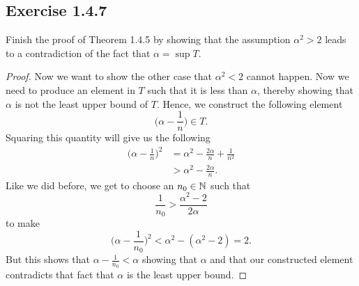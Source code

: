     \subsection{Exercise 1.4.7}

    Finish the proof of Theorem 1.4.5 by showing that the assumption \( \alpha ^2 > 2 \) leads to a contradiction of the fact that \( \alpha = \sup T \). 
        
        
    
    \begin{proof}
        Now we want to show the other case that \( \alpha^2 < 2 \) cannot happen. Now we need to produce an element in \( T \) such that it is less than \( \alpha \), thereby showing that \( \alpha \) is not the least upper bound of \( T \). Hence, we construct the following element 
        \[ \bigg(\alpha - \frac{1}{n}\bigg)\in T. \]
        Squaring this quantity will give us the following
        \begin{align*}
            \bigg(\alpha - \frac{1}{n}\bigg)^2 &= \alpha^2 -\frac{2\alpha}{n} + \frac{1}{n^2} \\
            &> \alpha^2 - \frac{2 \alpha}{n}.
        \end{align*}
        Like we did before, we get to choose an \( n_0 \in \mathbb{N} \) such that 
        \[ \frac{1}{n_0} > \frac{\alpha^2 - 2}{2 \alpha} \]
        to make 
        \[\bigg(\alpha - \frac{1}{n_0}\bigg)^2 < \alpha^2 - (\alpha^2 - 2) = 2.\]
        But this shows that \( \alpha - \frac{1}{n_0} < \alpha \) showing that \( \alpha \) and that our constructed element contradicts that fact that \( \alpha\) is the least upper bound. 
    \end{proof}


